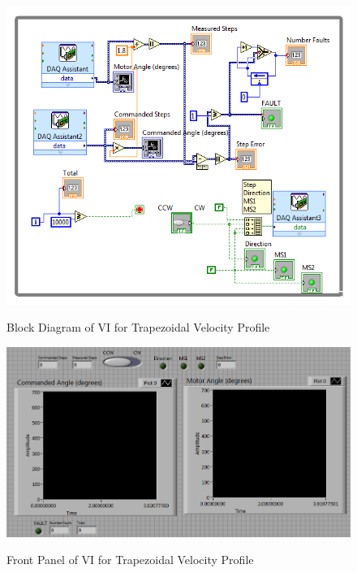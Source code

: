 \documentclass{article}
\theoremstyle{plain}
\theoremstyle{definition}
\theoremstyle{remark}
\begin{document}
\begin{figure}[h!]
\begin{center}
\includegraphics[width=16cm]{ExternalsourceBack.png}
\caption{Block Diagram of VI for Trapezoidal Velocity Profile} \label{tex}
\label{fig:q4_5}
\end{center}
\end{figure}

\begin{figure}[h!]
\begin{center}
\includegraphics[width=12cm]{ExternalSourceFront.png}
\caption{Front Panel of VI for Trapezoidal Velocity Profile} \label{tex}
\label{fig:q4_6}
\end{center}
\end{figure}
\end{document}
